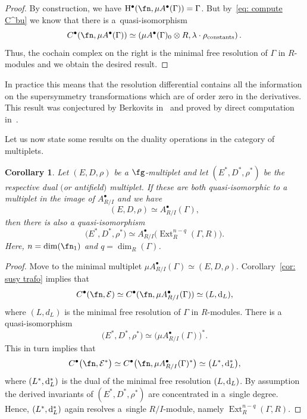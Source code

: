 \documentclass[10pt,a4paper]{amsart}
\numberwithin{equation}{section}
\newtheorem{cor}[thm]{Corollary}
\def\cE{\mathcal E}\def\cF{\mathcal F}\def\cG{\mathcal G}\def\cH{\mathcal H}
\def\bu{\bullet}
\def\d{{\rm d}}
\DeclareMathOperator{\Ext}{Ext}
\begin{document}
\begin{proof}
	By construction, we have $\mathrm H^\bullet(\fn , \mu A^\bu(\Gamma)) = \Gamma$. But by~\eqref{eq: compute C^bu} we know that there is a~quasi-isomorphism
	\begin{equation*}
	C^\bullet(\fn , \mu A^\bu(\Gamma)) \simeq \left( \mu A^\bu(\Gamma)_0 \otimes R , \lambda \cdot \rho_{\mathrm{constants}} \right) .
	\end{equation*}
	Thus, the cochain complex on the right is the minimal free resolution of $\Gamma$ in $R$-modules and we obtain the desired result.
\end{proof}

In practice this means that the resolution differential contains all the information on the supersymmetry transformations which are of order zero in the derivatives. This result was conjectured by Berkovits in~\cite{BerkovitsSupermembrane} and proved by direct computation in~\cite{perspectives}.

Let us now state some results on the duality operations in the category of multiplets.

\begin{cor}
	Let $(E,D,\rho)$ be a $\fg$-multiplet and let $(E^*, D^*, \rho^*)$ be the respective dual $($or antifield$)$ multiplet. If these are both quasi-isomorphic to a multiplet in the image of $A^\bullet_{R/I}$ and we have
	\begin{equation*}
	(E,D,\rho) \simeq A^\bullet_{R/I}(\Gamma) ,
	\end{equation*}
	then there is also a quasi-isomorphism
	\begin{equation*}
	\big(E^*, D^*,\rho^*\big) \simeq A^\bullet_{R/I}\big(\Ext_R^{n-q}(\Gamma,R)\big) .
	\end{equation*}
	Here, $n= \dim(\fn_1)$ and $q = \dim_R(\Gamma)$.
\end{cor}
\begin{proof}
	Move to the minimal multiplet $\mu A^\bullet_{R/I}(\Gamma) \simeq (E,D,\rho)$. Corollary~\ref{cor: susy trafo} implies that
	\begin{equation*}
	C^\bullet(\fn , \cE) \simeq C^\bullet(\fn , \mu A^\bullet_{R/I}(\Gamma)) \simeq (L,\d_L) ,
	\end{equation*}
	where $(L,d_L)$ is the minimal free resolution of $\Gamma$ in $R$-modules. There is a quasi-isomorphism
	\begin{equation*}
	\big(E^*,D^* ,\rho^*\big) \simeq \big(\mu A^\bullet_{R/I}(\Gamma) \big)^* .
	\end{equation*}
	This in turn implies that
	\begin{equation*}
	C^\bullet\big(\fn , \cE^*\big) \simeq C^\bullet\big(\fn , \mu A^\bullet_{R/I}(\Gamma)^* \big) \simeq \big(L^* , \d_L^*\big) ,
	\end{equation*}
	where $(L^*,\d_L^*)$ is the dual of the minimal free resolution $(L,\d_L)$. By assumption the derived invariants of $(E^*,D^*,\rho^*)$ are concentrated in a~single degree. Hence, $(L^*,\d_L^*)$ again resolves a~single $R/I$-module, namely $\Ext_R^{n-q}(\Gamma,R)$.
\end{proof}
\end{document}
